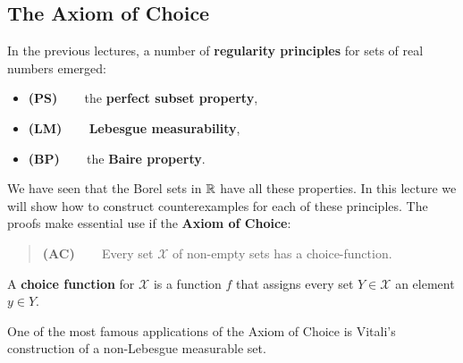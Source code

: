 \subsection{The Axiom of Choice}

In the previous lectures, a number of \textbf{regularity principles} for sets of real numbers emerged:

\begin{itemize}
\item \textbf{(PS)} ~~~ the \textbf{perfect subset property},
\item \textbf{(LM)} ~~~ \textbf{Lebesgue measurability},
\item \textbf{(BP)}  ~~~ the \textbf{Baire property}.
\end{itemize}

We have seen that the Borel sets in $\mathbb{R}$ have all these properties. In this lecture we will show how to construct counterexamples for each of these principles. The proofs make essential use if the \textbf{Axiom of Choice}:

\begin{quote}
\textbf{(AC)} ~~~ Every set $\mathcal{X}$ of non-empty sets has a choice-function.
\end{quote}

A \textbf{choice function} for $\mathcal{X}$ is a function $f$ that assigns every set $Y \in \mathcal{X}$ an element $y \in Y$.

One of the most famous applications of the Axiom of Choice is Vitali's construction of a non-Lebesgue measurable set.

